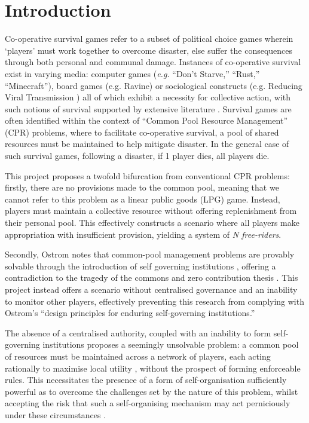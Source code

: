 \chapter{Introduction}\label{introduction}

Co-operative survival games refer to a subset of political choice games wherein `players' must work together to overcome disaster, else suffer the consequences through both personal and communal damage. Instances of co-operative survival exist in varying media: computer games (\emph{e.g.} ``Don't Starve,'' ``Rust,'' ``Minecraft''), board games (e.g. Ravine) or sociological constructs (e.g. Reducing Viral Transmission ) all of which exhibit a necessity for collective action, with such notions of survival supported by extensive literature \cite{su10030652}. Survival games are often identified within the context of ``Common Pool Resource Management'' (CPR) \cite{ostromCollectiveAction} \cite{smartHome} problems, where to facilitate co-operative survival, a pool of shared resources must be maintained to help mitigate disaster. In the general case of such survival games, following a disaster, if 1 player dies, all players die.

This project proposes a twofold bifurcation from conventional CPR problems: firstly, there are no provisions made to the common pool, meaning that we cannot refer to this problem as a linear public goods (LPG) game. Instead, players must maintain a collective resource without offering replenishment from their personal pool. This effectively constructs a scenario where all players make appropriation with insufficient provision, yielding a system of \textit{N free-riders}. 

Secondly, Ostrom notes that common-pool management problems are provably solvable through the introduction of self governing institutions \cite{ostromCollectiveAction}, offering a contradiction to the tragedy of the commons and zero contribution thesis \cite{zeroCon}. This project instead offers a scenario without centralised governance and an inability to monitor other players, effectively preventing this research from complying with Ostrom’s ``design principles for enduring self-governing institutions.''

The absence of a centralised authority, coupled with an inability to form self-governing institutions proposes a seemingly unsolvable problem: a common pool of resources must be maintained across a network of players, each acting rationally to maximise local utility \cite{oberUtil}, without the prospect of forming enforceable rules. This necessitates the presence of a form of self-organisation sufficiently powerful as to overcome the challenges set by the nature of this problem, whilst accepting the risk that such a self-organising mechanism may act perniciously under these circumstances \cite{dobSteg}.

